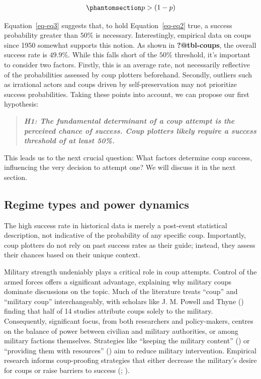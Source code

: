 \documentclass[
  12pt,
]{report}
\begin{document}
\begin{equation}\phantomsection\label{eq-eq3}{
\begin{aligned}
p > (1-p)
\end{aligned}
}\end{equation}

Equation~\ref{eq-eq3} suggests that, to hold Equation~\ref{eq-eq2} true,
a success probability greater than \(50\%\) is necessary. Interestingly,
empirical data on coups since 1950 somewhat supports this notion. As
shown in \textbf{?@tbl-coups}, the overall success rate is \(49.9\%\).
While this falls short of the \(50\%\) threshold, it's important to
consider two factors. Firstly, this is an average rate, not necessarily
reflective of the probabilities assessed by coup plotters beforehand.
Secondly, outliers such as irrational actors and coups driven by
self-preservation may not prioritize success probabilities. Taking these
points into account, we can propose our first hypothesis:

\begin{quote}
\textbf{\emph{H1: The fundamental determinant of a coup attempt is the
perceived chance of success. Coup plotters likely require a success
threshold of at least 50\%.}}
\end{quote}

This leads us to the next crucial question: What factors determine coup
success, influencing the very decision to attempt one? We will discuss
it in the next section.

\subsection{Regime types and power
dynamics}\label{regime-types-and-power-dynamics}

The high success rate in historical data is merely a post-event
statistical description, not indicative of the probability of any
specific coup. Importantly, coup plotters do not rely on past success
rates as their guide; instead, they assess their chances based on their
unique context.

Military strength undeniably plays a critical role in coup attempts.
Control of the armed forces offers a significant advantage, explaining
why military coups dominate discussions on the topic. Much of the
literature treats ``coup'' and ``military coup'' interchangeably, with
scholars like J. M. Powell and Thyne ()
finding that half of 14 studies attribute coups solely to the military.
Consequently, significant focus, from both researchers and
policy-makers, centres on the balance of power between civilian and
military authorities, or among military factions themselves. Strategies
like ``keeping the military content'' () or ``providing them with resources''
() aim to
reduce military intervention. Empirical research informs coup-proofing
strategies that either decrease the military's desire for coups or raise
barriers to success (;
).
\end{document}
